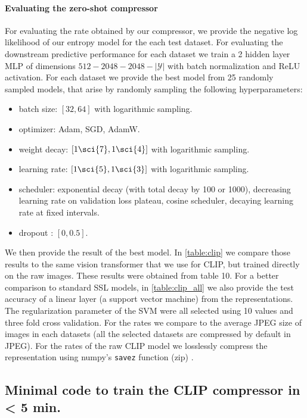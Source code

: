 \documentclass[final]{article}
\begin{document}
\paragraph{Evaluating the zero-shot compressor}
For evaluating the rate obtained by our compressor, we provide the negative log likelihood of our entropy model for the each test dataset.
For evaluating the downstream predictive performance for each dataset we train a 2 hidden layer MLP of dimensions $512-2048-2048-|\mathcal{Y}|$ with batch normalization and ReLU activation.
For each dataset we provide the best model from 25 randomly sampled models, that arise by randomly sampling the following hyperparameters:
\begin{itemize}
\item batch size: $[32,64]$ with logarithmic sampling.
\item optimizer: Adam, SGD, AdamW.
\item weight decay: $[1\sci{7},1\sci{4}]$ with logarithmic sampling.
\item learning rate: $[1\sci{5},1\sci{3}]$ with logarithmic sampling.
\item scheduler: exponential decay (with total decay by 100 or 1000), decreasing learning rate on validation loss plateau, cosine scheduler, decaying learning rate at fixed intervals.
\item dropout \cite{srivastava_dropout_2014}: $[0,0.5]$.
\end{itemize}

We then provide the result of the best model. In \cref{table:clip} we compare those results to the same vision transformer that we use for CLIP, but trained directly on the raw images.
These results were obtained from  table 10.
For a better comparison to standard SSL models, in \cref{table:clip_all} we also provide the test accuracy of a linear layer (a support vector machine) from the representations. The regularization parameter of the SVM were all selected using 10 values and three fold cross validation.
For the rates we compare to the average JPEG size of images in each datasets (all the selected datasets are compressed by default in JPEG).
For the rates of the raw CLIP model we losslessly compress the representation using numpy's \texttt{savez} function (zip) \cite{harris_array_2020}.

\subsection{Minimal code to train the CLIP compressor in < 5 min.}
\label{appx:code_clip}
\end{document}
